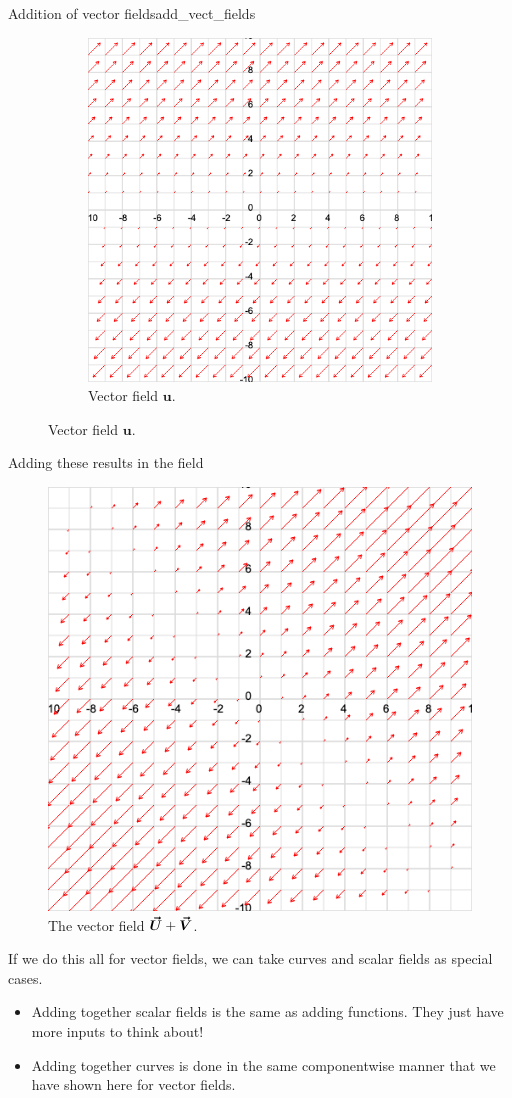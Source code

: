 \begin{ex}{Addition of vector fields}{add_vect_fields}
\begin{figure}[H]
\begin{subfigure}[h]{.45\textwidth}
            \includegraphics[width=\textwidth]{Figures_Part_6/vec_u.png}
            \caption{Vector field $\mathbf{u}$.}
            \end{subfigure}
        \end{figure}
        Adding these results in the field
        \begin{figure}[H]
            \centering
            \includegraphics[width=.45\textwidth]{Figures_Part_6/v_field_1.png}
            \caption{The vector field $\boldsymbol{\vec{U}}+\boldsymbol{\vec{V}}$.}
        \end{figure}
        \end{ex}
        
        \begin{remark}
        If we do this all for vector fields, we can take curves and scalar fields as special cases.
        \begin{itemize}
            \item Adding together scalar fields is the same as adding functions.  They just have more inputs to think about!
            \item Adding together curves is done in the same componentwise manner that we have shown here for vector fields.
        \end{itemize}
        \end{remark}
        
